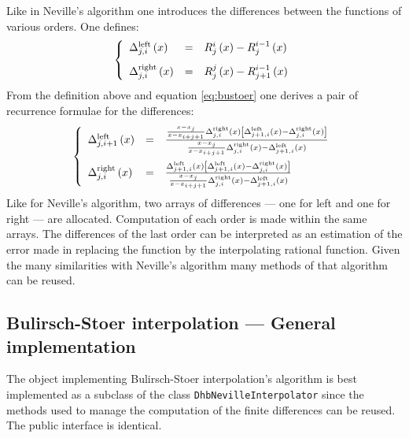 \documentclass[twoside]{book}
\begin{document}
Like in Neville's algorithm one introduces the differences between
the functions of various orders. One defines:
\begin{equation}
\left\{
\begin{array}{lcl}
    \Delta_{j,i}^{\mathop{\rm
left}}\left(x\right) & = & R_j^i\left(x\right) -
R_j^{i-1}\left(x\right)\\*[2ex]
    \Delta_{j,i}^{\mathop{\rm
right}}\left(x\right) & = & R_j^j\left(x\right) -
R_{j+1}^{i-1}\left(x\right)
  \end{array}\right.
\end{equation}
From the definition above and equation \ref{eq:bustoer} one
derives a pair of recurrence formulae for the differences:
\begin{equation}
\left\{
\begin{array}{lcl}
    \Delta_{j,i+1}^{\mathop{\rm
left}}\left(x\right) & = &{{x-x_j \over x - x_{i+j+1}}
\Delta_{j,i}^{\mathop{\rm right}}\left(x\right)
\left[\Delta_{j+1,i}^{\mathop{\rm left}}\left(x\right) -
\Delta_{j,i}^{\mathop{\rm right}}\left(x\right)\right] \over
{x-x_j \over x-x_{i+j+1}} \Delta_{j,i}^{\mathop{\rm
right}}\left(x\right) - \Delta_{j+1,i}^{\mathop{\rm
left}}\left(x\right)}
\\*[3ex]
    \Delta_{j,i}^{\mathop{\rm
right}}\left(x\right) & = &{ \Delta_{j+1,i}^{\mathop{\rm
left}}\left(x\right) \left[\Delta_{j+1,i}^{\mathop{\rm
left}}\left(x\right) - \Delta_{j,i}^{\mathop{\rm
right}}\left(x\right)\right] \over {x-x_j \over x-x_{i+j+1}}
\Delta_{j,i}^{\mathop{\rm right}}\left(x\right) -
\Delta_{j+1,i}^{\mathop{\rm left}}\left(x\right)}
  \end{array}\right.
\end{equation}
Like for Neville's algorithm, two arrays of differences --- one
for left and one for right --- are allocated. Computation of each
order is made within the same arrays. The differences of the last
order can be interpreted as an estimation of the error made in
replacing the function by the interpolating rational function.
Given the many similarities with Neville's algorithm many methods
of that algorithm can be reused.

\subsection{Bulirsch-Stoer interpolation --- General implementation}
 The object implementing
Bulirsch-Stoer interpolation's algorithm is best implemented as a
subclass of the class {\tt DhbNevilleInterpolator} since the
methods used to manage the computation of the finite differences
can be reused. The public interface is identical.
\end{document}
